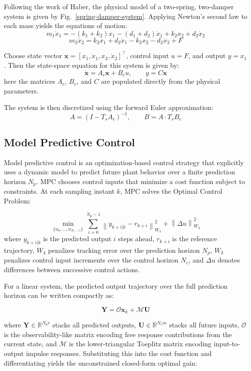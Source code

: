 \documentclass[11pt]{article}
\begin{document}
Following the work of Haber\cite{haber2023mpc1}, the physical model of a two-spring, two-damper system is given by Fig.~\ref{spring-damper-system}.
Applying Newton's second law to each mass yields the equations of motion:
$$m_1 \ddot{x}_1 = -(k_1+k_2)x_1 - (d_1+d_2)\dot{x}_1 + k_2 x_2 + d_2 \dot{x}_2$$
$$m_2 \ddot{x}_2 = k_2 x_1 + d_2 \dot{x}_1 - k_2 x_2 - d_2 \dot{x}_2 + F$$

Choose state vector $\mathbf{x} = [x_1, \dot{x}_1, x_2, \dot{x}_2]^\top$, control input $u = F$, and output $y = x_1$.
Then the state-space equation for this system is given by:
$$\dot{\mathbf{x}} = A_c \mathbf{x} + B_c u, \qquad y = C \mathbf{x}$$
here the matrices $A_c$, $B_c$, and $C$ are populated directly from the physical parameters.

The system is then discretized using the forward Euler approximation:
$$A = (I - T_s A_c)^{-1}, \qquad B = A \cdot T_s B_c$$

\subsection{Model Predictive Control}
Model predictive control is an optimization-based control strategy that explicitly uses a dynamic model to predict future plant behavior over a finite prediction horizon $N_p$.
MPC chooses control inputs that minimize a cost function subject to constraints.
At each sampling instant $k$, MPC solves the Optimal Control Problem:

$$\min_{\{u_0, \ldots, u_{N_c-1}\}} \sum_{i=0}^{N_p - 1} \left\| y_{k+i|k} - r_{k+i} \right\|^2_{W_4} + \left\| \Delta u \right\|^2_{W_3}$$
where $y_{k+i|k}$ is the predicted output $i$ steps ahead, $r_{k+i}$ is the reference trajectory, $W_4$ penalizes tracking error over the prediction horizon $N_p$, $W_3$ penalizes control input increments over the control horizon $N_c$, and $\Delta u$ denotes differences between successive control actions.

For a linear system, the predicted output trajectory over the full prediction horizon can be written compactly as:

$$\mathbf{Y} = \mathcal{O} \mathbf{x}_k + \mathcal{M} \mathbf{U}$$

where $\mathbf{Y} \in \mathbb{R}^{N_p r}$ stacks all predicted outputs, $\mathbf{U} \in \mathbb{R}^{N_c m}$ stacks all future inputs, $\mathcal{O}$ is the observability-like matrix encoding free response contributions from the current state, and $\mathcal{M}$ is the lower-triangular Toeplitz matrix encoding input-to-output impulse responses.
Substituting this into the cost function and differentiating yields the unconstrained closed-form optimal gain:
\end{document}
